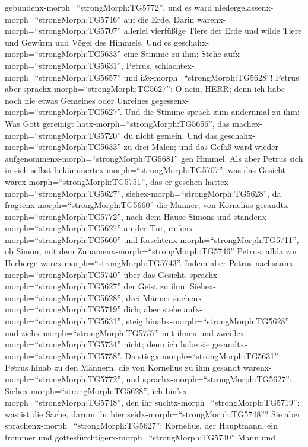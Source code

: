 gebundenx-morph=``strongMorph:TG5772'', und es ward
niedergelassenx-morph=``strongMorph:TG5746'' auf die Erde. 
Darin warenx-morph=``strongMorph:TG5707'' allerlei vierfüßige Tiere der
Erde und wilde Tiere und Gewürm und Vögel des Himmels.  Und
es geschahx-morph=``strongMorph:TG5633'' eine Stimme zu ihm: Stehe
aufx-morph=``strongMorph:TG5631'', Petrus,
schlachtex-morph=``strongMorph:TG5657'' und
ißx-morph=``strongMorph:TG5628''!  Petrus aber
sprachx-morph=``strongMorph:TG5627'': O nein, HERR; denn ich habe noch
nie etwas Gemeines oder Unreines gegessenx-morph=``strongMorph:TG5627''.
 Und die Stimme sprach zum andernmal zu ihm: Was Gott
gereinigt hatx-morph=``strongMorph:TG5656'', das
machex-morph=``strongMorph:TG5720'' du nicht gemein.  Und
das geschahx-morph=``strongMorph:TG5633'' zu drei Malen; und das Gefäß
ward wieder aufgenommenx-morph=``strongMorph:TG5681'' gen Himmel.
 Als aber Petrus sich in sich selbst
bekümmertex-morph=``strongMorph:TG5707'', was das Gesicht
wärex-morph=``strongMorph:TG5751'', das er gesehen
hattex-morph=``strongMorph:TG5627'',
siehex-morph=``strongMorph:TG5628'', da
fragtenx-morph=``strongMorph:TG5660'' die Männer, von Kornelius
gesandtx-morph=``strongMorph:TG5772'', nach dem Hause Simons und
standenx-morph=``strongMorph:TG5627'' an der Tür, 
riefenx-morph=``strongMorph:TG5660'' und
forschtenx-morph=``strongMorph:TG5711'', ob Simon, mit dem
Zunamenx-morph=``strongMorph:TG5746'' Petrus, allda zur Herberge
wärex-morph=``strongMorph:TG5743''.  Indem aber Petrus
nachsannx-morph=``strongMorph:TG5740'' über das Gesicht,
sprachx-morph=``strongMorph:TG5627'' der Geist zu ihm:
Siehex-morph=``strongMorph:TG5628'', drei Männer
suchenx-morph=``strongMorph:TG5719'' dich;  aber stehe
aufx-morph=``strongMorph:TG5631'', steig
hinabx-morph=``strongMorph:TG5628'' und
ziehx-morph=``strongMorph:TG5737'' mit ihnen und
zweiflex-morph=``strongMorph:TG5734'' nicht; denn ich habe sie
gesandtx-morph=``strongMorph:TG5758''.  Da
stiegx-morph=``strongMorph:TG5631'' Petrus hinab zu den Männern, die von
Kornelius zu ihm gesandt warenx-morph=``strongMorph:TG5772'', und
sprachx-morph=``strongMorph:TG5627'':
Siehex-morph=``strongMorph:TG5628'', ich
bin'sx-morph=``strongMorph:TG5748'', den ihr
suchtx-morph=``strongMorph:TG5719''; was ist die Sache, darum ihr hier
seidx-morph=``strongMorph:TG5748''?  Sie aber
sprachenx-morph=``strongMorph:TG5627'': Kornelius, der Hauptmann, ein
frommer und gottesfürchtigerx-morph=``strongMorph:TG5740'' Mann und
